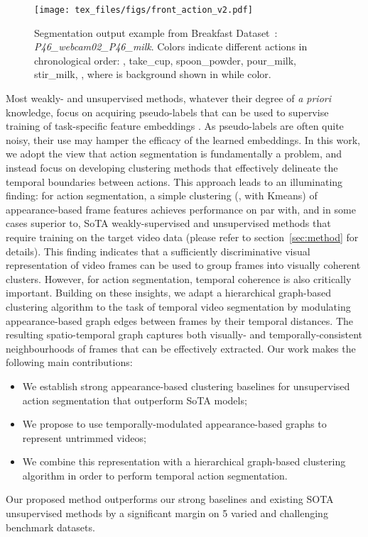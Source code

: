 \documentclass[10pt,twocolumn,letterpaper]{article}
\begin{document}
\begin{figure*}[hbt]
\centering
\texttt{[image: tex\_files/figs/front\_action\_v2.pdf]}

\caption{Segmentation output example from Breakfast Dataset~\cite{ute_15}: \textit{P46\_webcam02\_P46\_milk}.  Colors indicate different actions in chronological order:  , take\_cup, spoon\_powder, pour\_milk, stir\_milk, , where  is background shown in while color.\label{fig:teaser} }
\vspace{-0.3cm}
\end{figure*}


Most weakly- and unsupervised methods, whatever their degree of \textit{a priori} knowledge, focus on acquiring pseudo-labels that can be used to supervise training of task-specific feature embeddings \cite{cdfl,mallow,ute_7,ute_24,nnv,mucon}. As pseudo-labels are often quite noisy, their use may hamper the efficacy of the learned embeddings. In this work, we adopt the view that action segmentation is fundamentally a  problem, and instead focus on developing clustering methods that effectively delineate the temporal boundaries between actions. This approach leads to an illuminating finding: for action segmentation, a simple clustering (, with Kmeans) of appearance-based frame features achieves performance on par with, and in some cases superior to, SoTA weakly-supervised and unsupervised methods that require training on the target video data (please refer to section~\ref{sec:method} for details).
This finding indicates that a sufficiently discriminative visual representation of video frames can be used to group frames into visually coherent clusters.
However, for action segmentation, temporal coherence is also critically important.
Building on these insights, we adapt a hierarchical graph-based clustering algorithm to the task of temporal video segmentation by modulating appearance-based graph edges between frames by their temporal distances. The resulting spatio-temporal graph captures both visually- and temporally-consistent neighbourhoods of frames that can be effectively extracted.
Our work makes the following main contributions:
\begin{itemize}
    \item We establish strong appearance-based clustering baselines for unsupervised action segmentation that outperform SoTA models;
    \item We propose to use temporally-modulated appearance-based graphs to represent untrimmed videos;
    \item We combine this representation with a hierarchical graph-based clustering algorithm in order to perform temporal action segmentation.
\end{itemize}
Our proposed method outperforms our strong baselines and existing SOTA unsupervised methods by a significant margin on 5 varied and challenging benchmark datasets.
\end{document}
